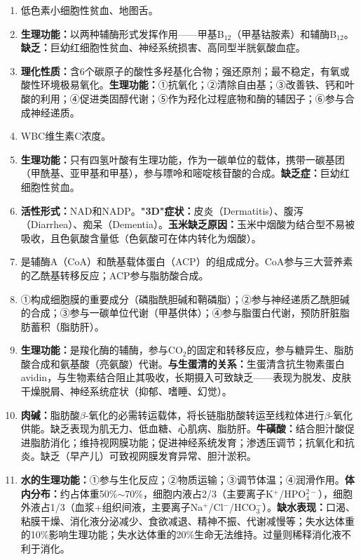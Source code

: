 {\begin{enumerate}[leftmargin=*, itemsep=5pt]
    \item 低色素小细胞性贫血、地图舌。
    \item \textbf{生理功能：}以两种辅酶形式发挥作用——甲基B$_{12}$（甲基钴胺素）和辅酶B$_{12}$。\textbf{缺乏：}巨幼红细胞性贫血、神经系统损害、高同型半胱氨酸血症。
    \item \textbf{理化性质：}含6个碳原子的酸性多羟基化合物；强还原剂；最不稳定，有氧或酸性环境极易氧化。\textbf{生理功能：}①抗氧化；②清除自由基；③改善铁、钙和叶酸的利用；④促进类固醇代谢；⑤作为羟化过程底物和酶的辅因子；⑥参与合成神经递质。
    \item WBC维生素C浓度。
    \item \textbf{生理功能：}只有四氢叶酸有生理功能，作为一碳单位的载体，携带一碳基团（甲酰基、亚甲基和甲基），参与嘌呤和嘧啶核苷酸的合成。\textbf{缺乏症：}巨幼红细胞性贫血。
    \item \textbf{活性形式：}NAD和NADP。\textbf{"3D"症状：}皮炎（Dermatitis）、腹泻（Diarrhea）、痴呆（Dementia）。\textbf{玉米缺乏原因：}玉米中烟酸为结合型不易被吸收，且色氨酸含量低（色氨酸可在体内转化为烟酸）。
    \item 是辅酶A（CoA）和酰基载体蛋白（ACP）的组成成分。CoA参与三大营养素的乙酰基转移反应；ACP参与脂肪酸合成。
    \item ①构成细胞膜的重要成分（磷脂酰胆碱和鞘磷脂）；②参与神经递质乙酰胆碱的合成；③参与一碳单位代谢（甲基供体）；④参与脂蛋白代谢，预防肝脏脂肪蓄积（脂肪肝）。
    \item \textbf{生理功能：}是羧化酶的辅酶，参与CO$_2$的固定和转移反应，参与糖异生、脂肪酸合成和氨基酸（亮氨酸）代谢。\textbf{与生蛋清的关系：}生蛋清含抗生物素蛋白avidin，与生物素结合阻止其吸收，长期摄入可致缺乏——表现为脱发、皮肤干燥脱屑、神经系统症状（抑郁、嗜睡、幻觉）。
    \item \textbf{肉碱：}脂肪酸$\beta$-氧化的必需转运载体，将长链脂肪酸转运至线粒体进行$\beta$-氧化供能。缺乏表现为肌无力、低血糖、心肌病、脂肪肝。\textbf{牛磺酸：}结合胆汁酸促进脂肪消化；维持视网膜功能；促进神经系统发育；渗透压调节；抗氧化和抗炎。缺乏（早产儿）可致视网膜发育异常、胆汁淤积。
    \item \textbf{水的生理功能：}①参与生化反应；②物质运输；③调节体温；④润滑作用。\textbf{体内分布：}约占体重50\%$\sim$70\%，细胞内液占2/3（主要离子K$^+$/HPO$_4^{2-}$），细胞外液占1/3（血浆+组织间液，主要离子Na$^+$/Cl$^-$/HCO$_3^-$）。\textbf{缺水表现：}口渴、粘膜干燥、消化液分泌减少、食欲减退、精神不振、代谢减慢等；失水达体重的10\%影响生理功能；失水达体重的20\%生命无法维持。过量则稀释消化液不利于消化。
\end{enumerate}

}
\newpage
